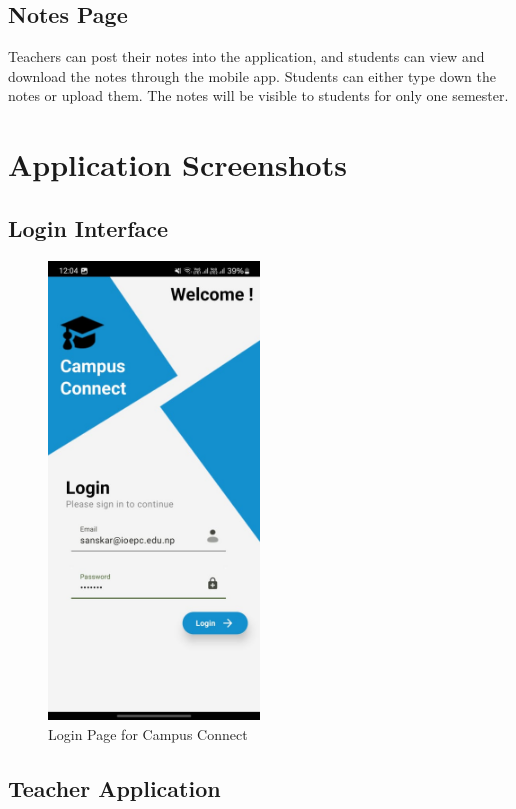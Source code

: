 \subsection{Notes Page}
Teachers can post their notes into the application, and students can view and download the notes through the mobile app. Students can either type down the notes or upload them. The notes will be visible to students for only one semester.

\section{Application Screenshots}

\subsection{Login Interface}
\begin{figure}[H]
    \centering
    \includegraphics[width=0.5\textwidth]{Graphics/output/login_page.jpg}
    \caption{Login Page for Campus Connect}
    \label{fig:login_page}
\end{figure}

\subsection{Teacher Application}

